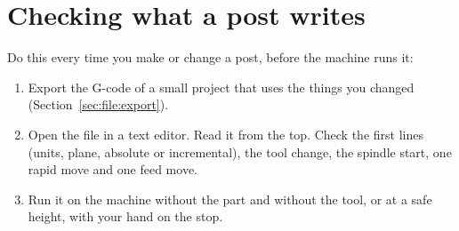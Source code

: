 \section{Checking what a post writes}\label{sec:posts:check}
Do this every time you make or change a post, before the machine runs it:
\begin{enumerate}
  \item Export the G-code of a small project that uses the things you changed (Section~\ref{sec:file:export}).
  \item Open the file in a text editor. Read it from the top. Check the first lines (units, plane, absolute or incremental), the tool change, the spindle start, one rapid move and one feed move.
  \item Run it on the machine without the part and without the tool, or at a safe height, with your hand on the stop.
\end{enumerate}
